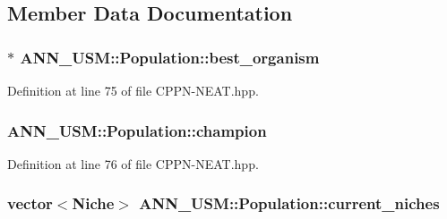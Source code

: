 \subsection{Member Data Documentation}
\hypertarget{class_a_n_n___u_s_m_1_1_population_a00cc470bf44ddbb9c104d3eead923dc3}{
\subsubsection[{best\-\_\-organism}]{$\ast$ A\-N\-N\-\_\-\-U\-S\-M\-::\-Population\-::best\-\_\-organism}}\label{class_a_n_n___u_s_m_1_1_population_a00cc470bf44ddbb9c104d3eead923dc3}


Definition at line 75 of file C\-P\-P\-N-\/\-N\-E\-A\-T.\-hpp.

\hypertarget{class_a_n_n___u_s_m_1_1_population_a8fadd74c69061f51a5e3ea9a3d4aa516}{
\subsubsection[{champion}]{ A\-N\-N\-\_\-\-U\-S\-M\-::\-Population\-::champion}}\label{class_a_n_n___u_s_m_1_1_population_a8fadd74c69061f51a5e3ea9a3d4aa516}


Definition at line 76 of file C\-P\-P\-N-\/\-N\-E\-A\-T.\-hpp.

\hypertarget{class_a_n_n___u_s_m_1_1_population_aa45357359720f5ce88603d0282d22f17}{
\subsubsection[{current\-\_\-niches}]{\setlength{\rightskip}{0pt plus 5cm}vector$<${\bf Niche}$>$ A\-N\-N\-\_\-\-U\-S\-M\-::\-Population\-::current\-\_\-niches}}\label{class_a_n_n___u_s_m_1_1_population_aa45357359720f5ce88603d0282d22f17}



